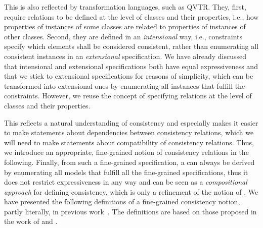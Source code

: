 This is also reflected by transformation languages, such as \gls{QVTR}.
They, first, require relations to be defined at the level of classes and their properties, i.e., how properties of instances of some classes are related to properties of instances of other classes.
Second, they are defined in an \emph{intensional} way, i.e., constraints specify which elements shall be considered consistent, rather than enumerating all consistent instances in an \emph{extensional} specification.
We have already discussed that intensional and extensional specifications both have equal expressiveness and that we stick to extensional specifications for reasons of simplicity, which can be transformed into extensional ones by enumerating all instances that fulfill the constraints.
However, we reuse the concept of specifying relations at the level of classes and their properties. %

This reflects a natural understanding of consistency and especially makes it easier to make statements about dependencies between consistency relations, which we will need to make statements about compatibility of consistency relations.
Thus, we introduce an appropriate, fine-grained notion of consistency relations in the following. %
Finally, from such a fine-grained specification, a \modellevelconsistencyrelation can always be derived by enumerating all models that fulfill all the fine-grained specifications, thus it does not restrict expressiveness in any way and can be seen as a \emph{compositional approach} for defining consistency, which is only a refinement of the notion of \modellevelconsistencyrelations.
We have presented the following definitions of a fine-grained consistency notion, partly literally, in previous work~. 
The definitions are based on those proposed in the work of \textcite[Section 2.3.2, 4.1.1]{kramer2017a} and .


